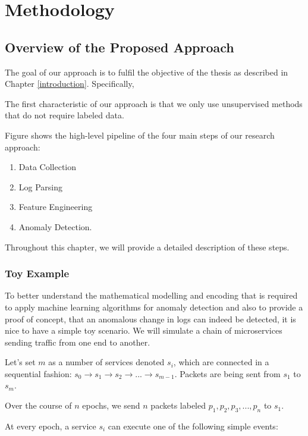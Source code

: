 \chapter{Methodology}
\label{methodology}

\section{Overview of the Proposed Approach}
The goal of our approach is to fulfil the objective of the thesis as described in Chapter \ref{introduction}. Specifically, 

The first characteristic of our approach is that we only use unsupervised methods that do not require labeled data. 

Figure  shows the high-level pipeline of the four main steps of our research approach:

\begin{enumerate}
    \item Data Collection 
    \item Log Parsing
    \item Feature Engineering
    \item Anomaly Detection.
\end{enumerate}

Throughout this chapter, we will provide a detailed description of these steps.

\subsection{Toy Example}
To better understand the mathematical modelling and encoding that is required to apply machine learning algorithms for anomaly detection and also to provide a proof of concept, that an anomalous change in logs can indeed be detected, it is nice to have a simple toy scenario. We will simulate a chain of microservices sending traffic from one end to another.

Let's set $m$ as a number of services denoted $s_i$, which are connected in a sequential fashion: $s_0 \rightarrow s_1 \rightarrow s_2 \rightarrow ... \rightarrow s_{m-1}$. Packets are being sent from $s_1$ to $s_m$.

Over the course of $n$ epochs, we send $n$ packets labeled $p_1, p_2, p_3, ..., p_n$ to $s_1$.

At every epoch, a service $s_i$ can execute one of the following simple events: 

